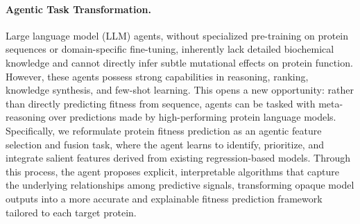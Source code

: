 \paragraph{Agentic Task Transformation.} Large language model (LLM) agents, without specialized pre-training on protein sequences or domain-specific fine-tuning, inherently lack detailed biochemical knowledge and cannot directly infer subtle mutational effects on protein function. However, these agents possess strong capabilities in reasoning, ranking, knowledge synthesis, and few-shot learning. This opens a new opportunity: rather than directly predicting fitness from sequence, agents can be tasked with meta-reasoning over predictions made by high-performing protein language models. Specifically, we reformulate protein fitness prediction as an agentic feature selection and fusion task, where the agent learns to identify, prioritize, and integrate salient features derived from existing regression-based models. Through this process, the agent proposes explicit, interpretable algorithms that capture the underlying relationships among predictive signals, transforming opaque model outputs into a more accurate and explainable fitness prediction framework tailored to each target protein.










